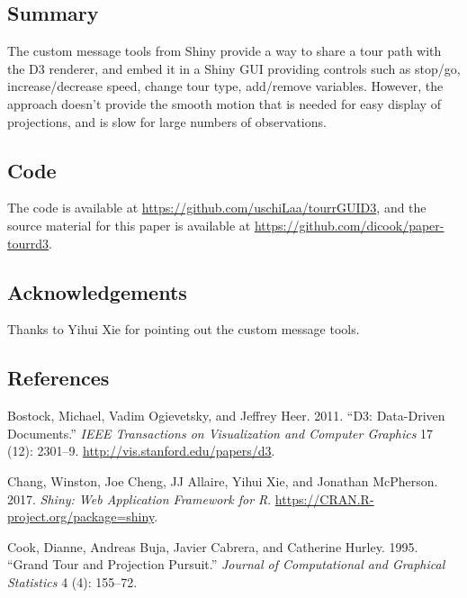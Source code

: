 \hypertarget{summary}{%
\subsection{Summary}\label{summary}}

The custom message tools from Shiny provide a way to share a tour path
with the D3 renderer, and embed it in a Shiny GUI providing controls
such as stop/go, increase/decrease speed, change tour type, add/remove
variables. However, the approach doesn't provide the smooth motion that
is needed for easy display of projections, and is slow for large numbers
of observations.

\hypertarget{code}{%
\subsection{Code}\label{code}}

The code is available at \url{https://github.com/uschiLaa/tourrGUID3},
and the source material for this paper is available at
\url{https://github.com/dicook/paper-tourrd3}.

\hypertarget{acknowledgements}{%
\subsection{Acknowledgements}\label{acknowledgements}}

Thanks to Yihui Xie for pointing out the custom message tools.

\hypertarget{references}{%
\subsection{References}\label{references}}

\hypertarget{refs}{}
\leavevmode\hypertarget{ref-D3}{}%
Bostock, Michael, Vadim Ogievetsky, and Jeffrey Heer. 2011. ``D3:
Data-Driven Documents.'' \emph{IEEE Transactions on Visualization and
Computer Graphics} 17 (12): 2301--9.
\url{http://vis.stanford.edu/papers/d3}.

\leavevmode\hypertarget{ref-shiny}{}%
Chang, Winston, Joe Cheng, JJ Allaire, Yihui Xie, and Jonathan
McPherson. 2017. \emph{Shiny: Web Application Framework for R}.
\url{https://CRAN.R-project.org/package=shiny}.

\leavevmode\hypertarget{ref-gt_pp}{}%
Cook, Dianne, Andreas Buja, Javier Cabrera, and Catherine Hurley. 1995.
``Grand Tour and Projection Pursuit.'' \emph{Journal of Computational
and Graphical Statistics} 4 (4): 155--72.

